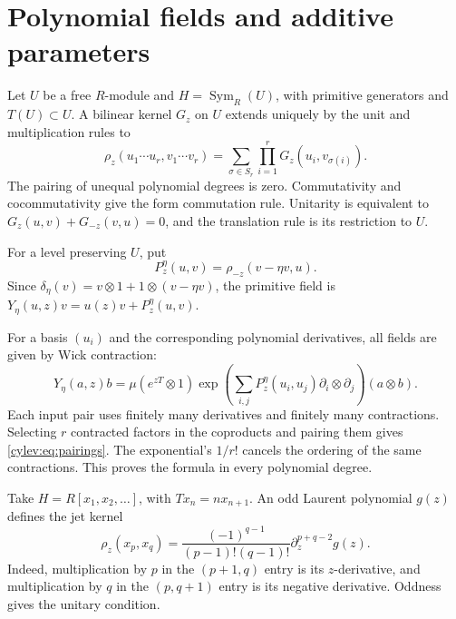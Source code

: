 \section{Polynomial fields and additive parameters}

Let $U$ be a free $R$-module and $H=\operatorname{Sym}_R(U)$, with
primitive generators and $T(U)\subset U$.
A bilinear kernel $G_z$ on $U$ extends uniquely by the unit and
multiplication rules to
\begin{equation}\label{cylev:eq:pairings}
 \rho_z(u_1\cdots u_r,v_1\cdots v_r)
       =\sum_{\sigma\in S_r}\prod_{i=1}^rG_z(u_i,v_{\sigma(i)}).
\end{equation}
The pairing of unequal polynomial degrees is zero.
Commutativity and cocommutativity give the form commutation rule.
Unitarity is equivalent to $G_z(u,v)+G_{-z}(v,u)=0$, and the
translation rule is its restriction to $U$.

For a level preserving $U$, put
\begin{equation}\label{cylev:eq:primitive-contraction}
 P_z^\eta(u,v)=\rho_{-z}(v-\eta v,u).
\end{equation}
Since $\delta_\eta(v)=v\otimes1+1\otimes(v-\eta v)$,
the primitive field is $Y_\eta(u,z)v=u(z)v+P_z^\eta(u,v)$.

For a basis $(u_i)$ and the corresponding polynomial derivatives,
all fields are given by Wick contraction:
\begin{equation}\label{cylev:eq:wick}
 Y_\eta(a,z)b=
 \mu(e^{zT}\otimes1)
 \exp\!\left(\sum_{i,j}P_z^\eta(u_i,u_j)
                         \partial_i\otimes\partial_j\right)(a\otimes b).
\end{equation}
Each input pair uses finitely many derivatives and finitely many
contractions. Selecting $r$ contracted factors in the coproducts and
pairing them gives \eqref{cylev:eq:pairings}. The exponential's
$1/r!$ cancels the ordering of the same contractions.
This proves the formula in every polynomial degree.

Take $H=R[x_1,x_2,\ldots]$, with $Tx_n=nx_{n+1}$.
An odd Laurent polynomial $g(z)$ defines the jet kernel
\begin{equation}\label{cylev:eq:jet-kernel}
 \rho_z(x_p,x_q)=\frac{(-1)^{q-1}}{(p-1)!(q-1)!}
                       \partial_z^{p+q-2}g(z).
\end{equation}
Indeed, multiplication by $p$ in the $(p+1,q)$ entry is its
$z$-derivative, and multiplication by $q$ in the $(p,q+1)$ entry
is its negative derivative.
Oddness gives the unitary condition.

